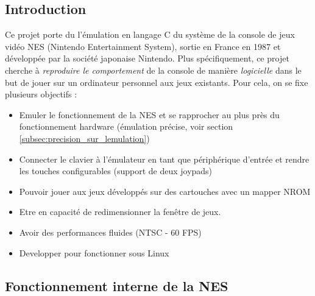 \subsection{Introduction}

Ce projet porte du l'émulation en langage C du système de la console de jeux vidéo NES (Nintendo Entertainment System), sortie en France en 1987 et développée par la société japonaise Nintendo. Plus spécifiquement, ce projet cherche à \emph{reproduire le comportement} de la console de manière \emph{logicielle} dans le but de jouer sur un ordinateur personnel aux jeux existants. Pour cela, on se fixe plusieurs objectifs :
\begin{itemize}
  \item Emuler le fonctionnement de la NES et se rapprocher au plus près du fonctionnement hardware (émulation précise, voir section \ref{subsec:precision_sur_lemulation})
  \item Connecter le clavier à l'émulateur en tant que périphérique d'entrée et rendre les touches configurables (support de deux joypads)
  \item Pouvoir jouer aux jeux développés sur des cartouches avec un mapper NROM
  \item Etre en capacité de redimensionner la fenêtre de jeux.
  \item Avoir des performances fluides (NTSC - 60 FPS)
  \item Developper pour fonctionner sous Linux
\end{itemize}

\subsection{Fonctionnement interne de la NES}
\label{subsec:fonctionnement_interne_nes}

